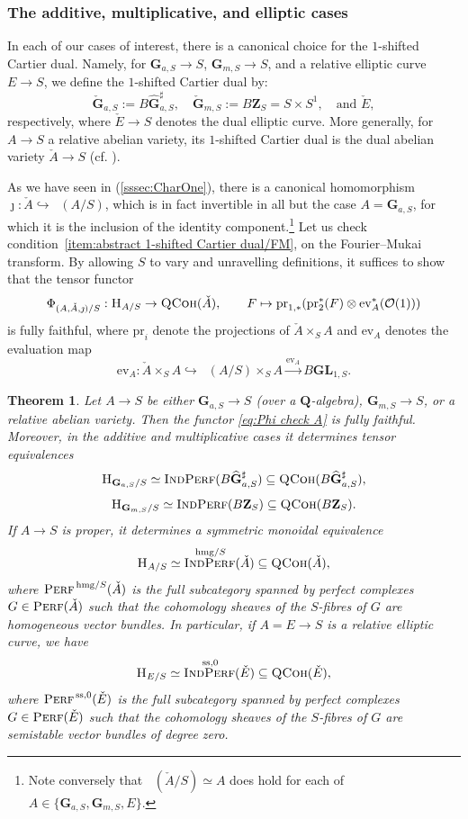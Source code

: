 \documentclass[12pt, oneside]{amsart}
\numberwithin{equation}{section}
\newtheorem{theorem}[subsubsection]{Theorem}
\theoremstyle{remark}
\theoremstyle{plain}
\DeclareMathOperator{\QCoh}{\textsc{QCoh}}
\DeclareMathOperator{\Perf}{\textsc{Perf}}
\DeclareMathOperator{\IndPerf}{\textsc{IndPerf}}
\newcommand{\Hcat}{\textup{\textsc{H}}}
\newcommand{\HAS}{\Hcat_{A/S}}
\DeclareMathOperator{\CharOne}{\chi^{(1)}}
\newcommand{\OO}{\mathcal{O}}
\newcommand{\GG}{\mathbf{G}}
\newcommand{\GGhat}{\widehat{\mathbf{G}}}
\newcommand{\GGaS}{\mathbf{G}_{a,S}}
\newcommand{\GGmS}{\mathbf{G}_{m,S}}
\newcommand{\GL}{\mathbf{GL}}
\newcommand{\bZ}{\mathbf{Z}}
\newcommand{\bQ}{\mathbf{Q}}
\renewcommand{\ss}{\mathrm{ss}}
\newcommand{\pr}{\mathrm{pr}}
\newcommand{\ev}{\mathrm{ev}}
\begin{document}
\subsubsection{The additive, multiplicative, and elliptic cases}
\label{sssec:HA trichotomy}

In each of our cases of interest, there is a canonical choice for the $1$-shifted Cartier dual.
Namely, for $\GGaS \to S$, $\GGmS \to S$, and a relative elliptic curve $E \to S$, we define the $1$-shifted Cartier dual by:
\[
\check{\GG}_{a,S} := B\GGhat^\sharp_{a,S},
\quad \check{\GG}_{m,S} := B\mathbf{Z}_S = S \times S^1,
\quad \text{and }\check{E},
\]
respectively, where $\check{E} \to S$ denotes the dual elliptic curve.
More generally, for $A \to S$ a relative abelian variety, its $1$-shifted Cartier dual is the dual abelian variety $\check{A} \to S$ (cf. \cite[Prop.~6.8.2]{LurieEll1}).

As we have seen in (\ref{sssec:CharOne}), there is a canonical homomorphism $\jmath : \check{A} \hookrightarrow \CharOne(A/S)$, which is in fact invertible in all but the case $A=\GGaS$, for which it is the inclusion of the identity component.\footnote{%
Note conversely that $\CharOne(\check{A}/S) \simeq A$ does hold for each of $A \in \{ \GGaS, \GGmS, E \}$.
}
Let us check condition~\ref{item:abstract 1-shifted Cartier dual/FM}, on the Fourier--Mukai transform.
By allowing $S$ to vary and unravelling definitions, it suffices to show that the tensor functor
\begin{equation}\label{eq:Phi check A}
  \Phi_{(A,\check{A},\jmath)/S} : \HAS \to \QCoh(\check{A}),
  \qquad F \mapsto \pr_{1,*}(\pr_2^*(F) \otimes \ev^*_A(\OO(1)))
\end{equation}
is fully faithful, where $\pr_i$ denote the projections of $\check{A} \times_S A$ and $\ev_A$ denotes the evaluation map
\[ \ev_A : \check{A} \times_S A \hookrightarrow \CharOne(A/S) \times_S A \xrightarrow{\ev_A} B\GL_{1,S}. \]

\begin{theorem} \label{thm:HA vs QCoh checkA} Let $A \to S$ be either $\GGaS \to S$ (over a $\bQ$-algebra), $\GGmS \to S$, or a relative abelian variety. Then the functor \eqref{eq:Phi check A} is fully faithful. Moreover, in the additive and multiplicative cases it determines tensor equivalences
\[ \Hcat_{\GGaS/S} \simeq \IndPerf(B\GGhat_{a,S}^\sharp) \subseteq \QCoh(B\GGhat_{a,S}^\sharp), \]
\[ \Hcat_{\GGmS/S} \simeq \IndPerf(B\bZ_S) \subseteq \QCoh(B\bZ_S). \]
If $A \to S$ is proper, it determines a symmetric monoidal equivalence
\[ \Hcat_{A/S} \simeq \IndPerf^{\,\text{hmg}/S}(\check{A}) \subseteq \QCoh(\check{A}), \]
where $\Perf^{\,\text{hmg}/S}(\check{A})$ is the full subcategory spanned by perfect complexes $G\in\Perf(\check{A})$ such that the cohomology sheaves of the $S$-fibres of $G$ are homogeneous vector bundles.
In particular, if $A=E \to S$ is a relative elliptic curve, we have
\[ \Hcat_{E/S} \simeq \IndPerf^{\,\ss,0}(\check{E}) \subseteq \QCoh(\check{E}), \]
where $\Perf^{\,\ss,0}(\check{E})$ is the full subcategory spanned by perfect complexes $G\in\Perf(\check{E})$ such that the cohomology sheaves of the $S$-fibres of $G$ are semistable vector bundles of degree zero.
\end{theorem}
\end{document}
